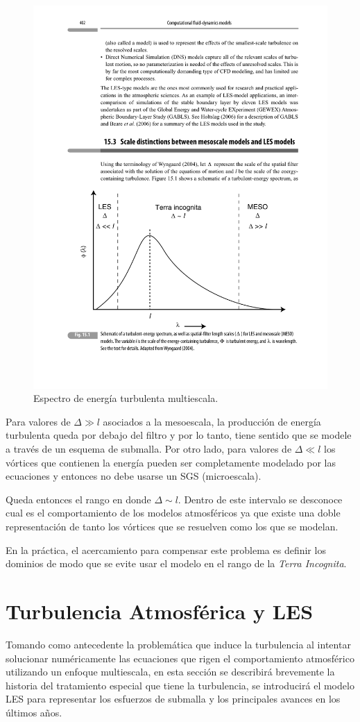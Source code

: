 \begin{figure}[H]
	\centering
	\includegraphics[width=0.8\linewidth,trim={2cm 3.0cm 1.5cm 11.5cm},clip]{Imagenes/02/terra_inc}
	\caption{Espectro de energía turbulenta multiescala.}
	\label{fig:02_terra_inc}
\end{figure}

Para valores de $\Delta\gg l$ asociados a la mesoescala, la producción de energía turbulenta queda por debajo del filtro y por lo tanto, tiene sentido que se modele a través de un esquema de submalla. Por otro lado, para valores de $\Delta\ll l$ los vórtices que contienen la energía pueden ser completamente modelado por las ecuaciones y entonces no debe usarse un SGS (microescala).

Queda entonces el rango en donde $\Delta\sim l$. Dentro de este intervalo se desconoce cual es el comportamiento de los modelos atmosféricos ya que existe una doble representación de tanto los vórtices que se resuelven como los que se modelan.

En la práctica, el acercamiento para compensar este problema es definir los dominios de modo que se evite usar el modelo en el rango de la \emph{Terra Incognita}.
\section{Turbulencia Atmosférica y LES}
Tomando como antecedente la problemática que induce la turbulencia al intentar solucionar numéricamente las ecuaciones que rigen el comportamiento atmosférico utilizando un enfoque multiescala, en esta sección se describirá brevemente la historia del tratamiento especial que tiene la turbulencia, se introducirá el modelo LES para representar los esfuerzos de submalla y los principales avances en los últimos años.

